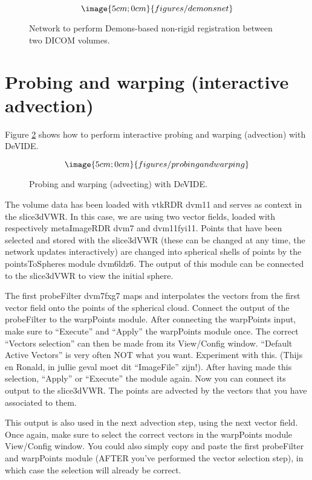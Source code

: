 \begin{figure}
$$\image{5cm;0cm}{figures/demonsnet}$$
\caption{Network to perform Demons-based non-rigid registration between two 
DICOM volumes.}\label{figdemons}
\end{figure}




\section{Probing and warping (interactive advection)}
Figure \ref{figPAW} shows how to perform interactive probing and
warping (advection) with DeVIDE.

\begin{figure}
$$\image{5cm;0cm}{figures/probingandwarping}$$
\caption{Probing and warping (advecting) with DeVIDE.}\label{figPAW}
\end{figure}

The volume data has been loaded with vtkRDR dvm11 and serves as
context in the slice3dVWR.  In this case, we are using two vector
fields, loaded with respectively metaImageRDR dvm7 and dvm11fyi11.
Points that have been selected and stored with the slice3dVWR (these
can be changed at any time, the network updates interactively) are
changed into spherical shells of points by the pointsToSpheres module
dvm6ldz6.  The output of this module can be connected to the
slice3dVWR to view the initial sphere.

The first probeFilter dvm7fxg7 maps and interpolates the vectors from
the first vector field onto the points of the spherical cloud.
Connect the output of the probeFilter to the warpPoints module.  After
connecting the warpPoints input, make sure to ``Execute'' and
``Apply'' the warpPoints module once.  The correct ``Vectors
selection'' can then be made from its View/Config window.  ``Default
Active Vectors'' is very often NOT what you want.  Experiment with
this.  (Thijs en Ronald, in jullie geval moet dit ``ImageFile''
zijn!).  After having made this selection, ``Apply'' or ``Execute''
the module again.  Now you can connect its output to the slice3dVWR.
The points are advected by the vectors that you have associated to
them.

This output is also used in the next advection step, using the next
vector field.  Once again, make sure to select the correct vectors in
the warpPoints module View/Config window.  You could also simply copy
and paste the first probeFilter and warpPoints module (AFTER you've
performed the vector selection step), in which case the selection will
already be correct.

